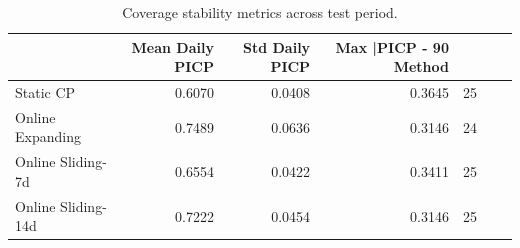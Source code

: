 \begin{table}
\caption{Coverage stability metrics across test period.}
\label{tab:t53_coverage_stability}
\begin{tabular}{lrrrr}
\toprule
 & Mean Daily PICP & Std Daily PICP & Max |PICP - 90%
Method &  &  &  &  \\
\midrule
Static CP & 0.6070 & 0.0408 & 0.3645 & 25 \\
Online Expanding & 0.7489 & 0.0636 & 0.3146 & 24 \\
Online Sliding-7d & 0.6554 & 0.0422 & 0.3411 & 25 \\
Online Sliding-14d & 0.7222 & 0.0454 & 0.3146 & 25 \\
\bottomrule
\end{tabular}
\end{table}
